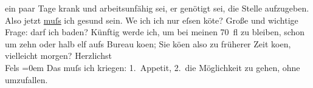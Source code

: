 \begin{ledgroupsized}[t]{13cm}
               ein paar Tage krank und arbeitsunfähig sei, er genötigt sei, die Stelle aufzugeben.
               Also jetzt \uline{muſs} ich gesund sein. We{\geminationn} ich ich nur eſsen kö{\geminationn}te?
               Große und wichtige Frage: darf ich baden?\pend
           \pstart
           Künftig werde ich, um bei meinen 70 fl zu bleiben, schon um zehn oder halb elf aufs
               Bureau ko{\geminationm}en; Sie kö{\geminationn}en
               also zu früherer Zeit ko{\geminationm}en, vielleicht morgen?\pend
           \pstart
           Herzlichst{\\[\baselineskip]}\spacefill\mbox{Fels}\pend
           \leftskip=0em{}\pstart
           \noindent{}Das muſs ich kriegen: 1. Appetit, 2. die Möglichkeit zu gehen, ohne
                  umzufallen.\pend
           
         
         \endnumbering{}\end{ledgroupsized}  \newcommand{\dateiname}{L00154}\newcommand{\titel}{Friedrich M. Fels an Arthur Schnitzler, [1. 1. 1893?]}\newcommand{\editorInnen}{Martin Anton Müller und Gerd-Hermann Susen}
      